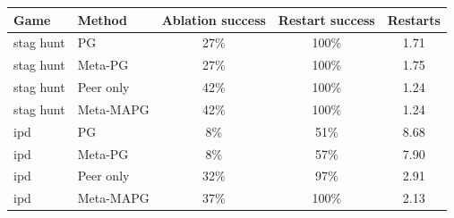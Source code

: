 \begin{tabular}{llccc}\toprule
Game & Method & Ablation success & Restart success & Restarts \\\midrule
stag hunt & PG & 27\% & 100\% & 1.71 \\
stag hunt & Meta-PG & 27\% & 100\% & 1.75 \\
stag hunt & Peer only & 42\% & 100\% & 1.24 \\
stag hunt & Meta-MAPG & 42\% & 100\% & 1.24 \\
ipd & PG & 8\% & 51\% & 8.68 \\
ipd & Meta-PG & 8\% & 57\% & 7.90 \\
ipd & Peer only & 32\% & 97\% & 2.91 \\
ipd & Meta-MAPG & 37\% & 100\% & 2.13 \\
\bottomrule
\end{tabular}
